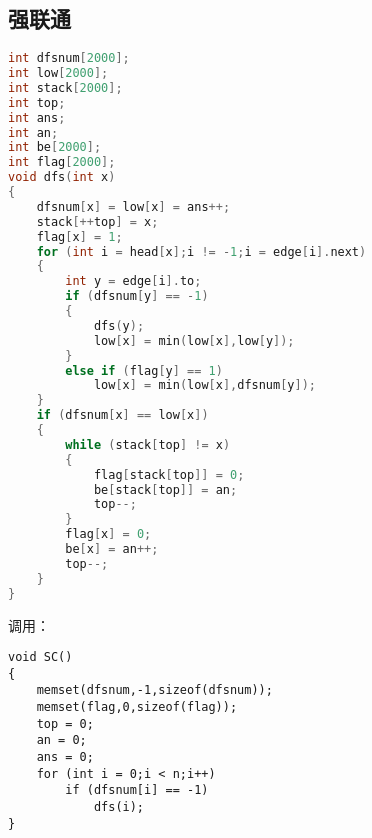 \subsection{强联通}
    \begin{lstlisting}[language=c++]
int dfsnum[2000];
int low[2000];
int stack[2000];
int top;
int ans;
int an;
int be[2000];
int flag[2000];
void dfs(int x)
{
    dfsnum[x] = low[x] = ans++;
    stack[++top] = x;
    flag[x] = 1;
    for (int i = head[x];i != -1;i = edge[i].next)
    {
        int y = edge[i].to;
        if (dfsnum[y] == -1)
        {
            dfs(y);
            low[x] = min(low[x],low[y]);
        }
        else if (flag[y] == 1)
            low[x] = min(low[x],dfsnum[y]);
    }
    if (dfsnum[x] == low[x])
    {
        while (stack[top] != x)
        {
            flag[stack[top]] = 0;
            be[stack[top]] = an;
            top--;
        }
        flag[x] = 0;
        be[x] = an++;
        top--;
    }
}
    \end{lstlisting}
    调用：\\
    \begin{lstlisting}
void SC()
{
    memset(dfsnum,-1,sizeof(dfsnum));
    memset(flag,0,sizeof(flag));
    top = 0;
    an = 0;
    ans = 0;
    for (int i = 0;i < n;i++)
        if (dfsnum[i] == -1)
            dfs(i);
}
    \end{lstlisting}